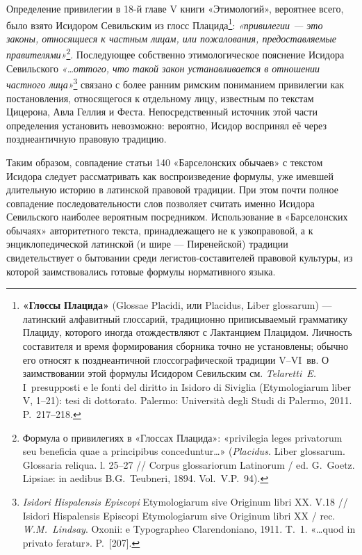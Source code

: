 Определение привилегии в 18-й главе V книги «Этимологий», вероятнее всего, было взято Исидором Севильским из глосс Плацида\footnote{\textbf{«}\textbf{Глоссы}\textbf{ }\textbf{Плацида}\textbf{»} (Glossae Placidi, или Placidus, Liber glossarum) --- латинский алфавитный глоссарий, традиционно приписываемый грамматику Плациду, которого иногда отождествляют с Лактанцием Плацидом. Личность составителя и время формирования сборника точно не установлены; обычно его относят к позднеантичной глоссографической традиции V--VI~вв. О заимствовании этой формулы Исидором Севильским см. \emph{Telaretti~E}\emph{. }I~presupposti e le fonti del diritto in Isidoro di Siviglia (Etymologiarum liber V, 1--21): tesi di dottorato. Palermo: Università degli Studi di Palermo, 2011. P.~217--218.}: \emph{«привилегии --- это законы, относящиеся к частным лицам, или пожалования, предоставляемые правителями»}\footnote{Формула о привилегиях в «Глоссах Плацида»: «privilegia leges privatorum seu beneficia quae a principibus conceduntur…» (\emph{Placidus}\emph{.} Liber glossarum. Glossaria reliqua. l. 25--27 // Corpus glossariorum Latinorum / ed. G.~Goetz. Lipsiae: in aedibus B.G.~Teubneri, 1894. Vol.~V.P.~94).}. Последующее собственно этимологическое пояснение Исидора Севильского \emph{«}\emph{…оттого, что такой закон устанавливается в отношении частного лица}\emph{»}\footnote{\emph{Isidori}\emph{ }\emph{Hispalensis}\emph{ }\emph{Episcopi} Etymologiarum sive Originum libri XX. V.18 // Isidori Hispalensis Episcopi Etymologiarum sive Originum libri XX / rec. \emph{W.M.~Lindsay}. Oxonii: e Typographeo Clarendoniano, 1911. T.~1. «…quod in privato feratur». P.~[207].} связано с более ранним римским пониманием привилегии как постановления, относящегося к отдельному лицу, известным по текстам Цицерона, Авла Геллия и Феста. Непосредственный источник этой части определения установить невозможно: вероятно, Исидор воспринял её через позднеантичную правовую традицию.

Таким образом, совпадение статьи 140 «Барселонских обычаев» с текстом Исидора следует рассматривать как воспроизведение формулы, уже имевшей длительную историю в латинской правовой традиции. При этом почти полное совпадение последовательности слов позволяет считать именно Исидора Севильского наиболее вероятным посредником. Использование в «Барселонских обычаях» авторитетного текста, принадлежащего не к узкоправовой, а к энциклопедической латинской (и шире --- Пиренейской) традиции свидетельствует о бытовании среди легистов-составителей правовой культуры, из которой заимствовались готовые формулы нормативного языка.

